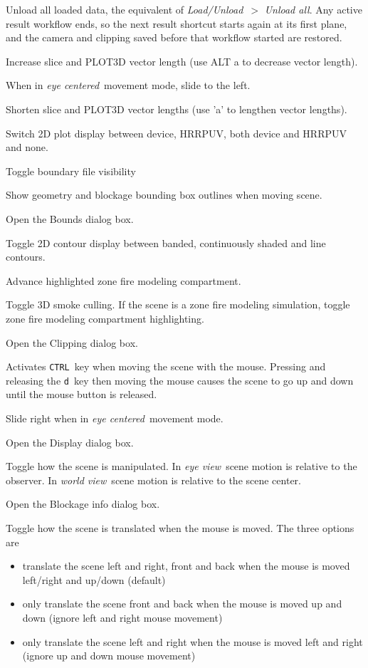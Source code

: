 \documentclass[11pt,twoside]{book}
\newcommand{\kitem}[1]{\item[{\bf {\tt #1 \  }} \hfill]}
\begin{document}
\kitem{CTRL u}Unload all loaded data, the equivalent of {\em Load/Unload}\ $>$
{\em Unload all}.  Any active result workflow ends, so the next result shortcut
starts again at its first plane, and the camera and clipping saved before that
workflow started are restored.


\kitem{a}Increase slice and PLOT3D vector length (use ALT a to decrease vector length).

\kitem{a}When in {\em eye centered}\ movement mode, slide to the left.

\kitem{ALT a}Shorten slice and PLOT3D vector lengths (use 'a' to lengthen vector lengths).

\kitem{A}Switch 2D plot display between device, HRRPUV,  both device and HRRPUV and none.

\kitem{b}Toggle boundary file visibility

\kitem{B}Show geometry and blockage bounding box outlines when moving scene.

\kitem{ALT b}Open the Bounds dialog box.

\kitem{c}Toggle 2D contour display between banded, continuously
shaded and line contours.

\kitem{c}Advance highlighted zone fire modeling compartment.

\kitem{C}Toggle 3D smoke culling.  If the scene is a zone fire modeling simulation,
toggle zone fire modeling compartment highlighting.

\kitem{ALT c}Open the Clipping dialog box.

\kitem{d}Activates {\tt CTRL}\ key when moving the scene with the mouse.
Pressing and releasing the {\tt d}\ key then moving the mouse causes the scene to go up and down until the
mouse button is released.

\kitem{D}Slide right when in {\em eye centered}\ movement mode.

\kitem{ALT d, D}Open the Display dialog box.

\kitem{e}Toggle how the scene is manipulated.  In {\em eye
view}\ scene motion is relative to the observer.  In {\em world
view}\ scene motion is relative to the scene center.

\kitem{ALT e}Open the Blockage info dialog box.

\kitem{E}Toggle how the scene is translated when the mouse is moved.
The three options are
\begin{itemize}
\item translate the scene left and right, front and back when the mouse is moved left/right and up/down (default)
\item only translate the scene front and back when the mouse is moved up and down (ignore left and right mouse movement)
\item only translate the scene left and right when the mouse is moved left and right (ignore up and down mouse movement)
\end{itemize}
\end{document}
